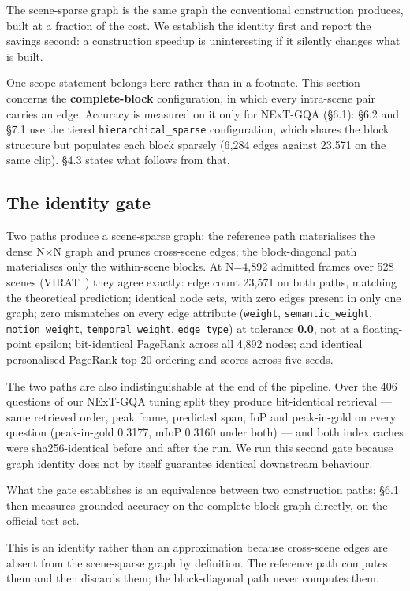 \documentclass[sigconf,review,anonymous]{acmart}
\begin{document}
The scene-sparse graph is the same graph the conventional construction produces, built at a
fraction of the cost. We establish the identity first and report the savings second: a
construction speedup is uninteresting if it silently changes what is built.

One scope statement belongs here rather than in a footnote. This section concerns the
\textbf{complete-block} configuration, in which every intra-scene pair carries an edge. Accuracy is
measured on it only for NExT-GQA (§6.1): §6.2 and §7.1 use the tiered \texttt{hierarchical\_sparse}
configuration, which shares the block structure but populates each block sparsely (6,284
edges against 23,571 on the same clip). §4.3 states what follows from that.

\subsection{The identity gate}

Two paths produce a scene-sparse graph: the reference path materialises the dense N\ensuremath{\times}N graph
and prunes cross-scene edges; the block-diagonal path materialises only the within-scene
blocks. At N=4,892 admitted frames over 528 scenes (VIRAT~\cite{oh2011virat}) they agree exactly: edge
count 23,571 on both paths, matching the theoretical prediction; identical node sets,
with zero edges present in only one graph; zero mismatches on every edge attribute
(\texttt{weight}, \texttt{semantic\_weight}, \texttt{motion\_weight}, \texttt{temporal\_weight}, \texttt{edge\_type}) at tolerance
\textbf{0.0}, not at a floating-point epsilon; bit-identical PageRank across all 4,892 nodes; and
identical personalised-PageRank top-20 ordering and scores across five seeds.

The two paths are also indistinguishable at the end of the pipeline. Over the 406 questions
of our NExT-GQA tuning split they produce bit-identical retrieval --- same retrieved order,
peak frame, predicted span, IoP and peak-in-gold on every question (peak-in-gold 0.3177, mIoP
0.3160 under both) --- and both index caches were sha256-identical before and after the
run. We run this second gate because graph identity does not by itself guarantee identical
downstream behaviour.

What the gate establishes is an equivalence between two construction paths; §6.1 then
measures grounded accuracy on the complete-block graph directly, on the official test set.

This is an identity rather than an approximation because cross-scene edges are absent from
the scene-sparse graph by definition. The reference path computes them and then discards
them; the block-diagonal path never computes them.
\end{document}
